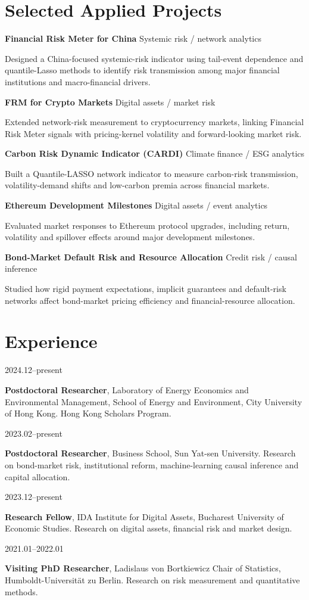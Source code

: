 \documentclass[10.5pt]{article}
\newcommand{\cvrow}[2]{%
  \par\noindent\needspace{2\baselineskip}%
  \begin{minipage}[t]{0.18\linewidth}\raggedright\sff\footnotesize\color{plum}#1\end{minipage}%
  \hfill\begin{minipage}[t]{0.80\linewidth}#2\end{minipage}%
  \par\addvspace{4.3pt}}
\newcommand{\project}[3]{%
  \par\noindent\needspace{3\baselineskip}%
  {\sff\bfseries\fontsize{9.4}{11}\selectfont\color{plumdeep}#1}%
  \hfill{\sff\fontsize{8.3}{10}\selectfont\color{signal}#2}\par
  {\fontsize{9.25}{12.1}\selectfont\color{inksoft}#3\par}\addvspace{4.3pt}}
\begin{document}
\section{Selected Applied Projects}
\project{Financial Risk Meter for China}{Systemic risk / network analytics}
{Designed a China-focused systemic-risk indicator using tail-event dependence and quantile-Lasso methods to identify risk transmission among major financial institutions and macro-financial drivers.}

\project{FRM for Crypto Markets}{Digital assets / market risk}
{Extended network-risk measurement to cryptocurrency markets, linking Financial Risk Meter signals with pricing-kernel volatility and forward-looking market risk.}

\project{Carbon Risk Dynamic Indicator (CARDI)}{Climate finance / ESG analytics}
{Built a Quantile-LASSO network indicator to measure carbon-risk transmission, volatility-demand shifts and low-carbon premia across financial markets.}

\project{Ethereum Development Milestones}{Digital assets / event analytics}
{Evaluated market responses to Ethereum protocol upgrades, including return, volatility and spillover effects around major development milestones.}

\project{Bond-Market Default Risk and Resource Allocation}{Credit risk / causal inference}
{Studied how rigid payment expectations, implicit guarantees and default-risk networks affect bond-market pricing efficiency and financial-resource allocation.}

\section{Experience}
\cvrow{2024.12--present}{\textbf{Postdoctoral Researcher}, Laboratory of Energy Economics and Environmental Management, School of Energy and Environment, City University of Hong Kong. Hong Kong Scholars Program.}
\cvrow{2023.02--present}{\textbf{Postdoctoral Researcher}, Business School, Sun Yat-sen University. Research on bond-market risk, institutional reform, machine-learning causal inference and capital allocation.}
\cvrow{2023.12--present}{\textbf{Research Fellow}, IDA Institute for Digital Assets, Bucharest University of Economic Studies. Research on digital assets, financial risk and market design.}
\cvrow{2021.01--2022.01}{\textbf{Visiting PhD Researcher}, Ladislaus von Bortkiewicz Chair of Statistics, Humboldt-Universit\"at zu Berlin. Research on risk measurement and quantitative methods.}
\end{document}
